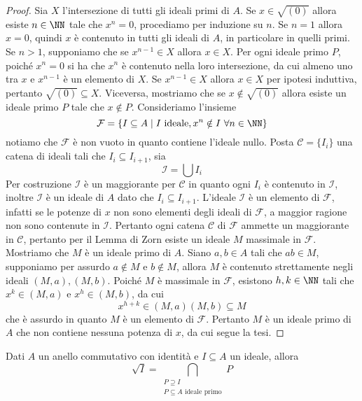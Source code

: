 \documentclass[11pt]{scrartcl}
\begin{document}
\begin{proof}
    Sia $X$ l'intersezione di tutti gli ideali primi di $A$. 
    Se $x \in \sqrt{(0)}$ allora esiste $n \in \NN$ tale che $x^n = 0$, procediamo
    per induzione su $n$. Se $n = 1$ allora $x = 0$, quindi $x$ è contenuto 
    in tutti gli ideali di $A$, in particolare in quelli primi. Se $n > 1$, 
    supponiamo che se $x^{n - 1} \in X$ allora $x \in X$.
    Per ogni ideale primo $P$, poiché $x^n = 0$ si ha che $x^n$ è contenuto nella
    loro intersezione, da cui almeno uno tra $x$ e $x^{n - 1}$ è un elemento
    di $X$. Se $x^{n - 1} \in X$ allora $x \in X$ per ipotesi induttiva, pertanto 
    $\sqrt{(0)} \subseteq X$. Viceversa, mostriamo che se $x \notin \sqrt{(0)}$
    allora esiste un ideale primo $P$ tale che $x \notin P$. Consideriamo 
    l'insieme
    \[
        \mathcal{F} = \{I \subseteq A \mid I \text{ ideale}, x^n \notin I
        ~\forall n \in \NN\}
    \]
    notiamo che $\mathcal{F}$ è non vuoto in quanto contiene l'ideale nullo.
    Posta $\mathscr{C} = \{I_i\}$ una catena di ideali tali che $I_i \subseteq I_{i + 1}$,
    sia
    \[
        \mathcal{I} = \bigcup I_i
    \]
    Per costruzione $\mathcal{I}$ è un maggiorante per $\mathscr{C}$ in quanto
    ogni $I_i$ è contenuto in $\mathcal{I}$, inoltre $\mathcal{I}$
    è un ideale di $A$ dato che $I_i \subseteq I_{i + 1}$. L'ideale $\mathcal{I}$
    è un elemento di $\mathcal{F}$, infatti se le potenze di $x$ non sono elementi
    degli ideali di $\mathcal{F}$, a maggior ragione non sono contenute in $\mathcal{I}$.
    Pertanto ogni catena $\mathscr{C}$ di $\mathcal{F}$ ammette un maggiorante 
    in $\mathscr{C}$, pertanto per il Lemma di Zorn esiste un ideale $M$ massimale
    in $\mathcal{F}$. Mostriamo che $M$ è un ideale primo di $A$. Siano $a, b \in A$
    tali che $ab \in M$, supponiamo per assurdo $a \notin M$ e $b \notin M$,
    allora $M$ è contenuto strettamente negli ideali $(M, a), (M, b)$. Poiché
    $M$ è massimale in $\mathcal{F}$, esistono $h, k \in \NN$ tali che $x^k \in (M, a)$
    e $x^h \in (M, b)$, da cui
    \[
        x^{h + k} \in (M, a)(M, b) \subseteq M
    \]
    che è assurdo in quanto $M$ è un elemento di $\mathcal{F}$. Pertanto 
    $M$ è un ideale primo di $A$ che non contiene nessuna potenza di $x$, 
    da cui segue la tesi.
\end{proof}

\begin{corollary}
    Dati $A$ un anello commutativo con identità e $I\subseteq A$ un ideale, 
    allora
    \[
        \sqrt{I} = \bigcap_{\substack{P\supseteq I\\ P \subseteq A\text{ ideale primo}}}P
    \]
\end{corollary}
\end{document}
